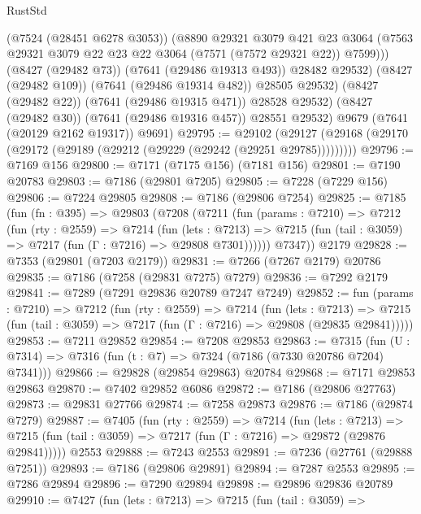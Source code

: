 \begin{lexlean}{RustStd}
\begin{coremodule}
                (@7524 (@28451 @6278 @3053))
                (@8890
                  @29321
                  @3079
                  @421
                  @23
                  @3064
                  (@7563 @29321 @3079 @22 @23 @22 @3064 (@7571 (@7572 @29321 @22)) @7599)))
              (@8427 (@29482 @73))
              (@7641 (@29486 @19313 @493))
              @28482
              @29532)
            (@8427 (@29482 @109))
            (@7641 (@29486 @19314 @482))
            @28505
            @29532)
          (@8427 (@29482 @22))
          (@7641 (@29486 @19315 @471))
          @28528
          @29532)
        (@8427 (@29482 @30))
        (@7641 (@29486 @19316 @457))
        @28551
        @29532)
      @9679
      (@7641 (@20129 @2162 @19317))
      @9691)
@29795 := @29102
    (@29127 (@29168 (@29170 (@29172 (@29189 (@29212 (@29229 (@29242 (@29251 @29785)))))))))
@29796 := @7169 @156
@29800 := @7171 (@7175 @156) (@7181 @156)
@29801 := @7190 @20783
@29803 := @7186 (@29801 @7205)
@29805 := @7228 (@7229 @156)
@29806 := @7224 @29805
@29808 := @7186 (@29806 @7254)
@29825 := @7185
    (fun (fn : @395) =>
    @29803
      (@7208
        (@7211
          (fun (params : @7210) =>
          @7212
            (fun (rty : @2559) =>
            @7214
              (fun (lets : @7213) =>
              @7215 (fun (tail : @3059) => @7217 (fun (Γ : @7216) => @29808 @7301))))))
        @7347))
    @2179
@29828 := @7353 (@29801 (@7203 @2179))
@29831 := @7266 (@7267 @2179) @20786
@29835 := @7186 (@7258 (@29831 @7275) @7279)
@29836 := @7292 @2179
@29841 := @7289 (@7291 @29836 @20789 @7247 @7249)
@29852 := fun (params : @7210) =>
  @7212
    (fun (rty : @2559) =>
    @7214
      (fun (lets : @7213) =>
      @7215 (fun (tail : @3059) => @7217 (fun (Γ : @7216) => @29808 (@29835 @29841)))))
@29853 := @7211 @29852
@29854 := @7208 @29853
@29863 := @7315
    (fun (U : @7314) => @7316 (fun (t : @7) => @7324 (@7186 (@7330 @20786 @7204) @7341)))
@29866 := @29828 (@29854 @29863) @20784
@29868 := @7171 @29853 @29863
@29870 := @7402 @29852 @6086
@29872 := @7186 (@29806 @27763)
@29873 := @29831 @27766
@29874 := @7258 @29873
@29876 := @7186 (@29874 @7279)
@29887 := @7405
    (fun (rty : @2559) =>
    @7214
      (fun (lets : @7213) =>
      @7215 (fun (tail : @3059) => @7217 (fun (Γ : @7216) => @29872 (@29876 @29841)))))
    @2553
@29888 := @7243 @2553
@29891 := @7236 (@27761 (@29888 @7251))
@29893 := @7186 (@29806 @29891)
@29894 := @7287 @2553
@29895 := @7286 @29894
@29896 := @7290 @29894
@29898 := @29896 @29836 @20789
@29910 := @7427
    (fun (lets : @7213) =>
    @7215
      (fun (tail : @3059) =>

\end{coremodule}
\end{lexlean}
